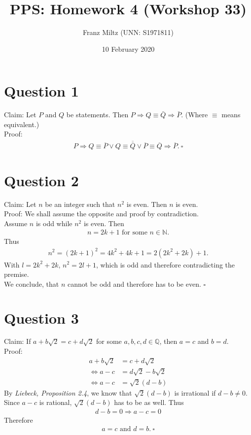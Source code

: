 \documentclass{article}
\title{PPS: Homework 4 (Workshop 33)}
\author{Franz Miltz (UNN: S1971811)}
\date{10 February 2020}
\begin{document}
\maketitle
\section*{Question 1}
Claim: Let $P$ and $Q$ be statements. Then $P\Rightarrow Q\equiv \bar{Q}\Rightarrow \bar{P}$. (Where $\equiv$ means equivalent.)\\
Proof:
\begin{align*}
  P\Rightarrow Q\equiv\overline{P}\vee Q\equiv \overline{\overline{Q}}\vee \overline{P}\equiv\overline{Q}\Rightarrow\overline{P}.\:\square
\end{align*}
\section*{Question 2}
Claim: Let $n$ be an integer such that $n^2$ is even. Then $n$ is even.\\
Proof: We shall assume the opposite and proof by contradiction.\\
Assume $n$ is odd while $n^2$ is even. Then
\begin{align*}
  n=2k+1 \text{ for some } n\in\mathbb{N}.
\end{align*}
Thus
\begin{align*}
  n^2=(2k+1)^2=4k^2+4k+1=2(2k^2+2k)+1.
\end{align*}
With $l=2k^2+2k$, $n^2=2l+1$, which is odd and therefore contradicting the premise.\\
We conclude, that $n$ cannot be odd and therefore has to be even. $\square$
\section*{Question 3}
Claim: If $a+b\sqrt{2}=c+d\sqrt{2}$ for some $a,b,c,d\in\mathbb{Q}$, then $a=c$ and $b=d$.\\
Proof:
\begin{align*}
  a+b\sqrt{2}         & =c+d\sqrt{2}         \\
  \Leftrightarrow a-c & =d\sqrt{2}-b\sqrt{2} \\
  \Leftrightarrow a-c & =\sqrt{2}(d-b)
\end{align*}
By \emph{Liebeck, Proposition 2.4}, we know that $\sqrt{2}(d-b)$ is irrational if $d-b\not=0$. Since $a-c$ is rational, $\sqrt{2}(d-b)$ has to be as well. Thus
\begin{align*}
  d-b=0 \Rightarrow a-c=0
\end{align*}
Therefore
\begin{align*}
  a=c \text{ and } d=b.\:\square
\end{align*}
\end{document}
